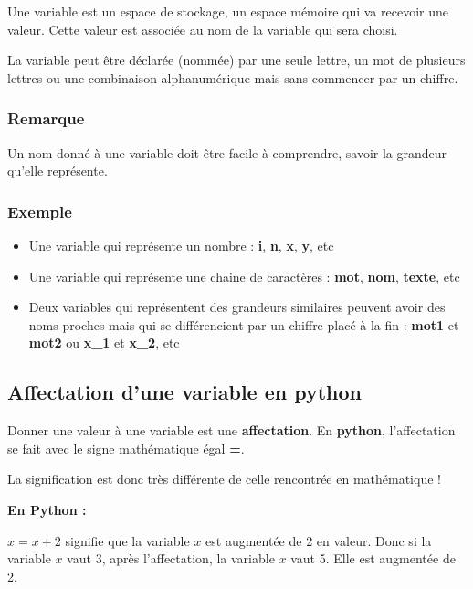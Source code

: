 \documentclass[11pt]{article}
\providecommand{\tightlist}{%
      \setlength{\itemsep}{0pt}\setlength{\parskip}{0pt}}
\begin{document}
Une variable est un espace de stockage, un espace mémoire qui va
recevoir une valeur. Cette valeur est associée au nom de la variable qui
sera choisi.

La variable peut être déclarée (nommée) par une seule lettre, un mot de
plusieurs lettres ou une combinaison alphanumérique mais sans commencer
par un chiffre.

\hypertarget{remarque}{%
\subsubsection*{Remarque}\label{remarque}}

Un nom donné à une variable doit être facile à comprendre, savoir la
grandeur qu'elle représente.

\hypertarget{exemple}{%
\subsubsection*{Exemple}\label{exemple}}

\begin{itemize}
\tightlist
\item
  Une variable qui représente un nombre : \textbf{i}, \textbf{n},
  \textbf{x}, \textbf{y}, etc
\item
  Une variable qui représente une chaine de caractères : \textbf{mot},
  \textbf{nom}, \textbf{texte}, etc
\item
  Deux variables qui représentent des grandeurs similaires peuvent avoir
  des noms proches mais qui se différencient par un chiffre placé à la
  fin : \textbf{mot1} et \textbf{mot2} ou \textbf{x\_1} et
  \textbf{x\_2}, etc
\end{itemize}

\hypertarget{affectation-dune-variable-en-python}{%
\subsection{Affectation d'une variable en
python}\label{affectation-dune-variable-en-python}}

Donner une valeur à une variable est une \textbf{affectation}. En
\textbf{python}, l'affectation se fait avec le signe mathématique égal
\textbf{=}.

La signification est donc très différente de celle rencontrée en
mathématique !

\textbf{En Python :}

\(x=x+2\) signifie que la variable \(x\) est augmentée de 2 en valeur.
Donc si la variable \(x\) vaut 3, après l'affectation, la variable \(x\)
vaut 5. Elle est augmentée de 2.
\end{document}
